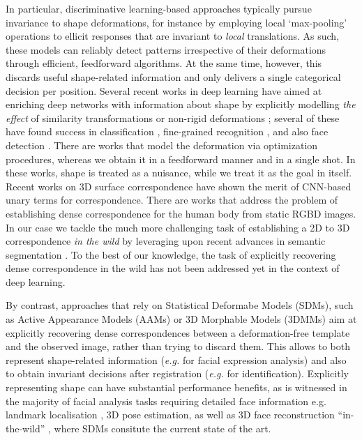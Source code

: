 \documentclass[10pt,twocolumn,letterpaper]{article}
\begin{document}
In particular, discriminative learning-based approaches typically pursue invariance to shape deformations, for instance by employing  local `max-pooling' operations to ellicit responses that are invariant to {\emph{local}} translations. As such, these models can reliably  detect patterns irrespective of their deformations through efficient, feedforward algorithms. At the same time, however, this discards useful shape-related information and only delivers a single categorical decision per position. Several recent works in deep learning have aimed at enriching deep networks with information about shape  by explicitly modelling {\em the effect} of  similarity transformations \cite{PapandreouKS15}
or non-rigid deformations \cite{JaderbergSZK15,HandaBPSMD16,ChenHW016}; several of these have found success in classification \cite{PapandreouKS15}, fine-grained recognition  \cite{JaderbergSZK15}, and also face detection \cite{ChenHW016}. There are works \cite{lades1993distortion,pedersoli2015elastic} that model the deformation via optimization procedures, whereas we obtain it in a feedforward manner and in a single shot. In these works, shape is treated as a nuisance, while we treat it as the goal in itself. Recent works on 3D surface correspondence \cite{ Br1,Br2} have shown the merit of CNN-based unary terms for correspondence. 
%
There are works that address the problem of  establishing dense correspondence for the human body from static RGBD images\cite{taylor2012vitruvian,pons2015metric,wei2016dense}.
%
In our case we tackle the much more challenging task of establishing a 2D to 3D correspondence {\emph{in the wild}} by leveraging upon recent advances in semantic segmentation \cite{CP2015Semantic}. To the best of our knowledge, the  task of explicitly recovering dense correspondence in the wild has not been addressed yet in the context of deep learning. 

By contrast, approaches that rely on  Statistical Deformabe Models (SDMs), such as Active Appearance Models (AAMs) or 3D Morphable Models (3DMMs) aim at explicitly recovering  dense correspondences between a deformation-free template and the observed image, rather than trying to discard them. This allows to both represent shape-related information (\textit{e.g.} for facial expression analysis) and also to obtain invariant decisions after registration (\textit{e.g.} for identification). Explicitly representing shape  can have substantial performance benefits, as is witnessed in the majority of facial analysis tasks requiring detailed face information e.g.  landmark localisation \cite{sagonas2016300}, 3D pose estimation, as well as 3D face reconstruction ``in-the-wild'' \cite{jourabloo2016large}, where SDMs consitute the current state of the art. 
\end{document}
